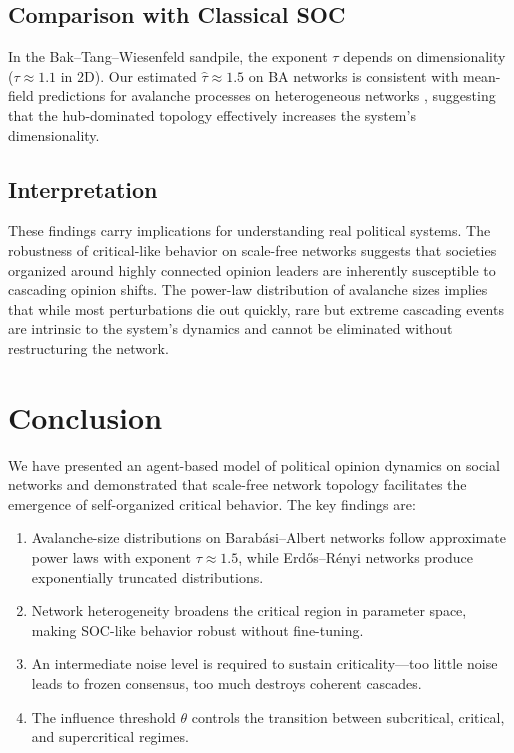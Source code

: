 \documentclass[11pt,twocolumn]{article}
\begin{document}
\subsection{Comparison with Classical SOC}

In the Bak--Tang--Wiesenfeld sandpile, the exponent $\tau$ depends on dimensionality ($\tau \approx 1.1$ in 2D). Our estimated $\hat{\tau} \approx 1.5$ on BA networks is consistent with mean-field predictions for avalanche processes on heterogeneous networks \citep{Goh2003}, suggesting that the hub-dominated topology effectively increases the system's dimensionality.

\subsection{Interpretation}

These findings carry implications for understanding real political systems. The robustness of critical-like behavior on scale-free networks suggests that societies organized around highly connected opinion leaders are inherently susceptible to cascading opinion shifts. The power-law distribution of avalanche sizes implies that while most perturbations die out quickly, rare but extreme cascading events are intrinsic to the system's dynamics and cannot be eliminated without restructuring the network.

\section{Conclusion}

We have presented an agent-based model of political opinion dynamics on social networks and demonstrated that scale-free network topology facilitates the emergence of self-organized critical behavior. The key findings are:

\begin{enumerate}
\item Avalanche-size distributions on Barab\'asi--Albert networks follow approximate power laws with exponent $\tau \approx 1.5$, while Erd\H{o}s--R\'enyi networks produce exponentially truncated distributions.
\item Network heterogeneity broadens the critical region in parameter space, making SOC-like behavior robust without fine-tuning.
\item An intermediate noise level is required to sustain criticality---too little noise leads to frozen consensus, too much destroys coherent cascades.
\item The influence threshold $\theta$ controls the transition between subcritical, critical, and supercritical regimes.
\end{enumerate}
\end{document}
